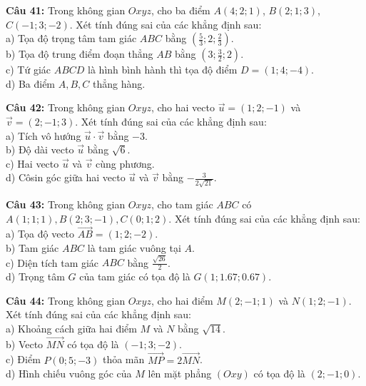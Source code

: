 \documentclass[12pt]{article}
\begin{document}
	\vspace{4mm}
	\noindent \textbf{Câu 41:} Trong không gian $Oxyz$, cho ba điểm $A(4; 2; 1)$, $B(2; 1; 3)$, $C(-1; 3; -2)$. Xét tính đúng sai của các khẳng định sau: \\
	\noindent a) Tọa độ trọng tâm tam giác $ABC$ bằng $\left(\frac{5}{3}; 2; \frac{2}{3}\right)$. \\
	\noindent b) Tọa độ trung điểm đoạn thẳng $AB$ bằng $\left(3; \frac{3}{2}; 2\right)$. \\
	\noindent c) Tứ giác $ABCD$ là hình bình hành thì tọa độ điểm $D = (1; 4; -4)$. \\
	\noindent d) Ba điểm $A, B, C$ thẳng hàng.
	
	\vspace{4mm}
	\noindent \textbf{Câu 42:} Trong không gian $Oxyz$, cho hai vecto $\vec{u} = (1; 2; -1)$ và $\vec{v} = (2; -1; 3)$. Xét tính đúng sai của các khẳng định sau: \\
	\noindent a) Tích vô hướng $\vec{u} \cdot \vec{v}$ bằng $-3$. \\
	\noindent b) Độ dài vecto $\vec{u}$ bằng $\sqrt{6}$. \\
	\noindent c) Hai vecto $\vec{u}$ và $\vec{v}$ cùng phương. \\
	\noindent d) Côsin góc giữa hai vecto $\vec{u}$ và $\vec{v}$ bằng $-\frac{3}{2\sqrt{21}}$.
	
	\vspace{4mm}
	\noindent \textbf{Câu 43:} Trong không gian $Oxyz$, cho tam giác $ABC$ có $A(1; 1; 1), B(2; 3; -1), C(0; 1; 2)$. Xét tính đúng sai của các khẳng định sau: \\
	\noindent a) Tọa độ vecto $\vec{AB} = (1; 2; -2)$. \\
	\noindent b) Tam giác $ABC$ là tam giác vuông tại $A$. \\
	\noindent c) Diện tích tam giác $ABC$ bằng $\frac{\sqrt{26}}{2}$. \\
	\noindent d) Trọng tâm $G$ của tam giác có tọa độ là $G(1; 1.67; 0.67)$.
	
	\vspace{4mm}
	\noindent \textbf{Câu 44:} Trong không gian $Oxyz$, cho hai điểm $M(2; -1; 1)$ và $N(1; 2; -1)$. Xét tính đúng sai của các khẳng định sau: \\
	\noindent a) Khoảng cách giữa hai điểm $M$ và $N$ bằng $\sqrt{14}$. \\
	\noindent b) Vecto $\vec{MN}$ có tọa độ là $(-1; 3; -2)$. \\
	\noindent c) Điểm $P(0; 5; -3)$ thỏa mãn $\vec{MP} = 2\vec{MN}$. \\
	\noindent d) Hình chiếu vuông góc của $M$ lên mặt phẳng $(Oxy)$ có tọa độ là $(2; -1; 0)$.
	
\end{document}
